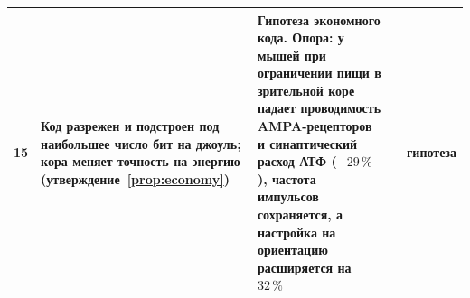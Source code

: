 {\begin{longtable}{>{\raggedright}p{0.5cm}>{\raggedright}p{4.0cm}>{\raggedright}p{5.6cm}>{\raggedright}p{2.3cm}>{\raggedright\arraybackslash}p{1.7cm}}
15 & Код разрежен и подстроен под наибольшее число бит на джоуль; кора меняет точность на энергию (утверждение~\ref{prop:economy}) & Гипотеза экономного кода. Опора: у мышей при ограничении пищи в зрительной коре падает проводимость AMPA-рецепторов и синаптический расход АТФ ($-29\,\%$), частота импульсов сохраняется, а настройка на ориентацию расширяется на $32\,\%$ & \cite{Barlow1961,Padamsey2022} & гипотеза \\
\bottomrule
\end{longtable}}
